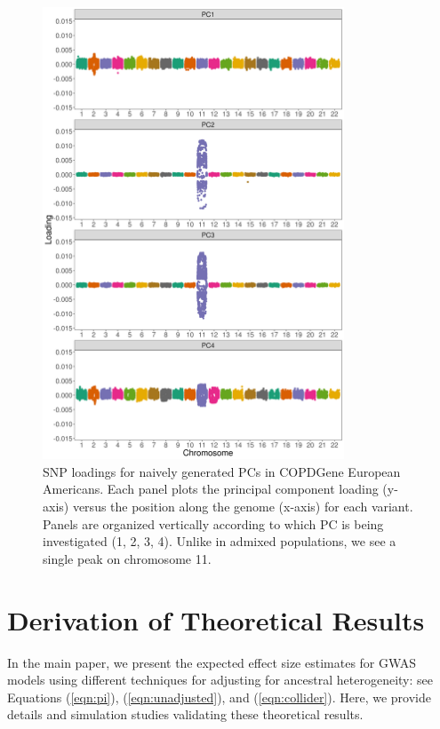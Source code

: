 \documentclass[12pt]{article}
\begin{document}
\begin{figure}
\center
\includegraphics[width=0.8\textwidth]{figs/finalfigs/figS6_EUR_prune_FALSE_1_0_0.01_snprelate_load_1}
\caption[SNP loadings in COPDGene European Americans.]{SNP loadings for naively generated PCs in COPDGene European Americans. Each panel plots the principal component loading (y-axis) versus the position along the genome (x-axis) for each variant. Panels are organized vertically according to which PC is being investigated (1, 2, 3, 4). Unlike in admixed populations, we see a single peak on chromosome 11.}
\label{fig:corr-Eur}
\end{figure}


\newpage
\section{Derivation of Theoretical Results}
\label{sec:theory}

In the main paper, we present the expected effect size estimates for GWAS models using different techniques for adjusting for ancestral heterogeneity: see Equations (\ref{eqn:pi}), (\ref{eqn:unadjusted}), and (\ref{eqn:collider}).
Here, we provide details and simulation studies validating these theoretical results.
\end{document}
